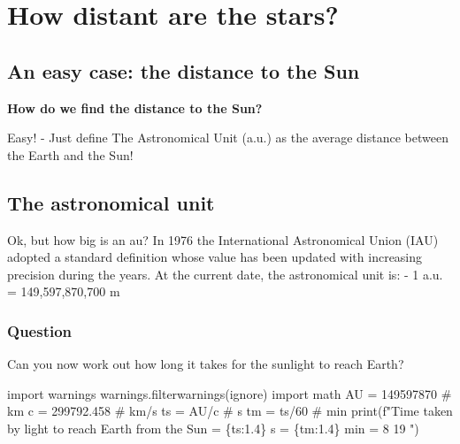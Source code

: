 \documentclass[
  letterpaper,
  DIV=11,
  numbers=noendperiod]{scrreprt}
\newenvironment{Shaded}{\begin{snugshade}}{\end{snugshade}}
\newcommand{\BuiltInTok}[1]{\textcolor[rgb]{0.00,0.23,0.31}{#1}}
\newcommand{\CommentTok}[1]{\textcolor[rgb]{0.37,0.37,0.37}{#1}}
\newcommand{\DecValTok}[1]{\textcolor[rgb]{0.68,0.00,0.00}{#1}}
\newcommand{\FloatTok}[1]{\textcolor[rgb]{0.68,0.00,0.00}{#1}}
\newcommand{\ImportTok}[1]{\textcolor[rgb]{0.00,0.46,0.62}{#1}}
\newcommand{\NormalTok}[1]{\textcolor[rgb]{0.00,0.23,0.31}{#1}}
\newcommand{\OperatorTok}[1]{\textcolor[rgb]{0.37,0.37,0.37}{#1}}
\newcommand{\SpecialCharTok}[1]{\textcolor[rgb]{0.37,0.37,0.37}{#1}}
\newcommand{\SpecialStringTok}[1]{\textcolor[rgb]{0.13,0.47,0.30}{#1}}
\newcommand{\StringTok}[1]{\textcolor[rgb]{0.13,0.47,0.30}{#1}}
\begin{document}

\hypertarget{how-distant-are-the-stars}{%
\chapter{How distant are the stars?}\label{how-distant-are-the-stars}}

\hypertarget{an-easy-case-the-distance-to-the-sun}{%
\section{An easy case: the distance to the
Sun}\label{an-easy-case-the-distance-to-the-sun}}

\textbf{How do we find the distance to the Sun?}

Easy! - Just define The Astronomical Unit (a.u.) as the average distance
between the Earth and the Sun!

\hypertarget{the-astronomical-unit}{%
\section{The astronomical unit}\label{the-astronomical-unit}}

Ok, but how big is an au? In 1976 the International Astronomical Union
(IAU) adopted a standard definition whose value has been updated with
increasing precision during the years. At the current date, the
astronomical unit is: - 1 a.u. = 149,597,870,700 m

\hypertarget{question}{%
\subsection{Question}\label{question}}

Can you now work out how long it takes for the sunlight to reach Earth?

\begin{Shaded}
\begin{Highlighting}[]
\ImportTok{import}\NormalTok{ warnings}
\NormalTok{warnings.filterwarnings(}\StringTok{\textquotesingle{}ignore\textquotesingle{}}\NormalTok{)}
\ImportTok{import}\NormalTok{ math}
\NormalTok{AU }\OperatorTok{=} \DecValTok{149597870} \CommentTok{\# km}
\NormalTok{c }\OperatorTok{=} \FloatTok{299792.458} \CommentTok{\# km/s}
\NormalTok{ts }\OperatorTok{=}\NormalTok{ AU}\OperatorTok{/}\NormalTok{c }\CommentTok{\# s}
\NormalTok{tm }\OperatorTok{=}\NormalTok{ ts}\OperatorTok{/}\DecValTok{60} \CommentTok{\# min}
\BuiltInTok{print}\NormalTok{(}\SpecialStringTok{f"Time taken by light to reach Earth from the Sun = }\SpecialCharTok{\{}\NormalTok{ts}\SpecialCharTok{:1.4\}}\SpecialStringTok{ s = }\SpecialCharTok{\{}\NormalTok{tm}\SpecialCharTok{:1.4\}}\SpecialStringTok{ min = 8\textquotesingle{} 19\textquotesingle{}\textquotesingle{} "}\NormalTok{)}
\end{Highlighting}
\end{Shaded}
\end{document}
